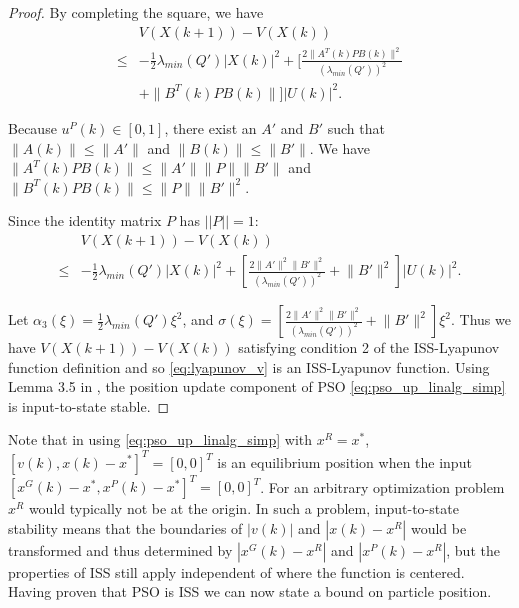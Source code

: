 \begin{mythm}
\begin{proof}
By completing the square, we have
\begin{equation}
\label{eq:lyapunov_delta4}
\begin{aligned}
& V( X(k+1) ) - V( X(k) ) \\
\leq & - \frac{1}{2} \lambda_{min}(Q') | X(k) |^{2} + [ \frac{2 \lVert A^{T}(k) P B(k) \rVert^{2}}{ ( \lambda_{min}(Q') )^{2} }  \\
& + \lVert B^{T}(k) P B(k) \rVert ] | U(k) |^{2}. 
\end{aligned}
\end{equation}

Because $ u^{P}(k) \in [0, 1] $, there exist an $ A' $ and $ B' $ such that $ \lVert A(k) \rVert \leq \lVert A' \rVert $ and $ \lVert B(k) \rVert \leq \lVert B' \rVert $.
We have $ \lVert A^{T}(k) P B(k) \rVert \leq \lVert A' \rVert \lVert P \rVert \lVert B' \rVert $ and $ \lVert B^{T}(k) P B(k) \rVert \leq \lVert P \rVert \lVert B' \rVert^{2} $.

Since the identity matrix $ P $ has $ || P || = 1 $:
\begin{equation}
\label{eq:lyapunov_delta5}
\begin{aligned}
& V( X(k+1) ) - V( X(k) ) \\
\leq & - \frac{1}{2} \lambda_{min}(Q') | X(k) |^{2} + [ \frac{2 \lVert A' \rVert^{2} \lVert B' \rVert^{2}}{ ( \lambda_{min}(Q') )^{2} } + \lVert B' \rVert^{2} ] | U(k) |^{2}.
\end{aligned}
\end{equation}

Let
$ \alpha_{3} ( \xi )= \frac{1}{2} \lambda_{min}(Q') \xi^{2} $,
and
$ \sigma ( \xi ) = [ \frac{2 \lVert A' \rVert^{2} \lVert B' \rVert^{2}}{ ( \lambda_{min}(Q') )^{2} } +  \lVert B' \rVert^{2} ] \xi^{2} $.
Thus we have $  V( X(k+1) ) - V( X(k) ) $ satisfying condition 2 of the ISS-Lyapunov function definition and
so \eqref{eq:lyapunov_v} is an ISS-Lyapunov function.
Using Lemma 3.5 in \cite{Jiang2001857}, the position update component of PSO \eqref{eq:pso_up_linalg_simp} is input-to-state stable.

\end{proof}
\end{mythm}

Note that in using \eqref{eq:pso_up_linalg_simp} with $ x^{R} = x^{*} $,
$ [ v(k), x(k) - x^{*} ]^{T} = [0, 0]^{T} $ is an equilibrium position when the input $ [ x^{G}(k) - x^{*} , x^{P}(k) - x^{*} ]^{T} = [0, 0]^{T} $.
For an arbitrary optimization problem $ x^{R} $ would typically not be at the origin. 
In such a problem, input-to-state stability means that the boundaries of $ | v(k) | $ and $ | x(k) - x^{R} | $ would be transformed and thus determined by $ | x^{G}(k) - x^{R} | $ and $ | x^{P}(k) - x^{R} | $,
but the properties of ISS still apply independent of where the function is centered.
Having proven that PSO is ISS we can now state a bound on particle position.

